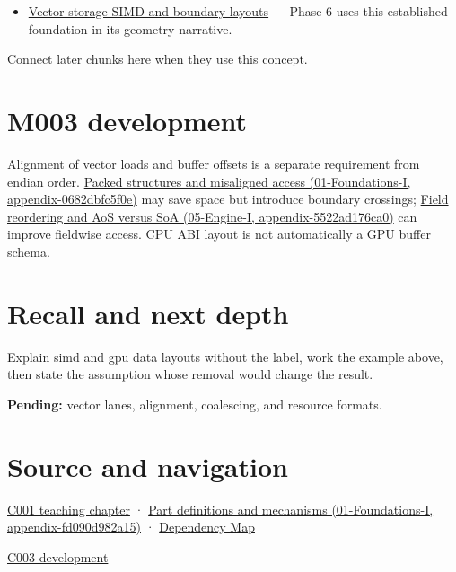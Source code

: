 \begin{itemize}
\tightlist
\item
  \hyperref[appendix-26bf6bf2fb8b]{Vector storage SIMD and boundary layouts} --- Phase 6 uses this established foundation in its geometry narrative.
\end{itemize}

Connect later chunks here when they use this concept.

\section{M003 development}\label{appendix-3c7b1a56de01-m003-development}

Alignment of vector loads and buffer offsets is a separate requirement from endian order. \href{../01-Foundations-I/main.pdf\#nameddest=appendix-0682dbfc5f0e}{Packed structures and misaligned access (01-Foundations-I, appendix-0682dbfc5f0e)} may save space but introduce boundary crossings; \href{../05-Engine-I/main.pdf\#nameddest=appendix-5522ad176ca0}{Field reordering and AoS versus SoA (05-Engine-I, appendix-5522ad176ca0)} can improve fieldwise access. CPU ABI layout is not automatically a GPU buffer schema.

\section{Recall and next depth}\label{appendix-3c7b1a56de01-recall-and-next-depth}

Explain simd and gpu data layouts without the label, work the example above, then state the assumption whose removal would change the result.

\textbf{Pending:} vector lanes, alignment, coalescing, and resource formats.

\section{Source and navigation}\label{appendix-3c7b1a56de01-source-and-navigation}

\href{Continuous\%20Notes/Computing\%20Foundations\%20-\%20From\%20Bits\%20to\%20C++\%20and\%20Systems\%20APIs\#From\%20a\%20signal\%20to\%20an\%20interpretation}{C001 teaching chapter} · \href{../01-Foundations-I/main.pdf\#nameddest=appendix-fd090d982a15}{Part definitions and mechanisms (01-Foundations-I, appendix-fd090d982a15)} · \hyperref[appendix-4ad47bdd269a]{Dependency Map}

\href{Continuous\%20Notes/Computing\%20Foundations\%20-\%20From\%20Bits\%20to\%20C++\%20and\%20Systems\%20APIs\#Where\%20the\%20bytes\%20live}{C003 development}
